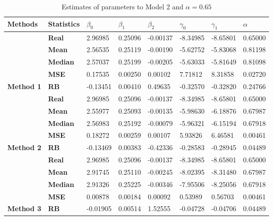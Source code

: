 \begin{table}

\caption{\label{tab:Est_model_2_Alpha0.65}Estimates of parameters to Model 2 and $\alpha=0.65$}
\centering
\begin{tabular}[t]{>{}l>{}lllllll}
\toprule
Methods & Statistics & $\beta_0$ & $\beta_1$ & $\beta_2$ & $\gamma_0$ & $\gamma_1$ & $\alpha$\\
\midrule
 & \textbf{Real} & 2.96985 & 0.25096 & -0.00137 & -8.34985 & -8.65801 & 0.65000\\
\cmidrule{2-8}
 & \textbf{Mean} & 2.56535 & 0.25119 & -0.00190 & -5.62752 & -5.83068 & 0.81198\\
\cmidrule{2-8}
 & \textbf{Median} & 2.57037 & 0.25199 & -0.00205 & -5.63033 & -5.81649 & 0.81098\\
\cmidrule{2-8}
 & \textbf{MSE} & 0.17535 & 0.00250 & 0.00102 & 7.71812 & 8.31858 & 0.02720\\
\cmidrule{2-8}
\multirow{-5}{*}{\raggedright\arraybackslash \textbf{Method 1}} & \textbf{RB} & -0.13451 & 0.00410 & 0.49635 & -0.32570 & -0.32820 & 0.24766\\
\cmidrule{1-8}
 & \textbf{Real} & 2.96985 & 0.25096 & -0.00137 & -8.34985 & -8.65801 & 0.65000\\
\cmidrule{2-8}
 & \textbf{Mean} & 2.55977 & 0.25093 & -0.00135 & -5.98630 & -6.18876 & 0.67987\\
\cmidrule{2-8}
 & \textbf{Median} & 2.56983 & 0.25192 & -0.00079 & -5.96321 & -6.15194 & 0.67918\\
\cmidrule{2-8}
 & \textbf{MSE} & 0.18272 & 0.00259 & 0.00107 & 5.93826 & 6.46581 & 0.00461\\
\cmidrule{2-8}
\multirow{-5}{*}{\raggedright\arraybackslash \textbf{Method 2}} & \textbf{RB} & -0.13469 & 0.00383 & -0.42336 & -0.28583 & -0.28945 & 0.04489\\
\cmidrule{1-8}
 & \textbf{Real} & 2.96985 & 0.25096 & -0.00137 & -8.34985 & -8.65801 & 0.65000\\
\cmidrule{2-8}
 & \textbf{Mean} & 2.91745 & 0.25110 & -0.00245 & -8.02395 & -8.31480 & 0.67987\\
\cmidrule{2-8}
 & \textbf{Median} & 2.91326 & 0.25225 & -0.00346 & -7.95506 & -8.25056 & 0.67918\\
\cmidrule{2-8}
 & \textbf{MSE} & 0.00878 & 0.00184 & 0.00092 & 0.53989 & 0.56703 & 0.00461\\
\cmidrule{2-8}
\multirow{-5}{*}{\raggedright\arraybackslash \textbf{Method 3}} & \textbf{RB} & -0.01905 & 0.00514 & 1.52555 & -0.04728 & -0.04706 & 0.04489\\
\bottomrule
\end{tabular}
\end{table}
